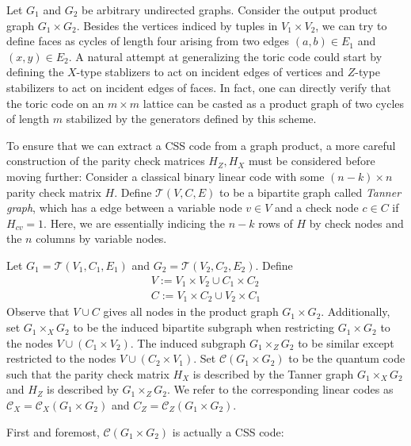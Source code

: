 \documentclass[12pt]{article}%
\theoremstyle{definition}
\begin{document}
Let $G_1$ and $G_2$ be arbitrary undirected graphs. Consider the output product graph $G_1 \times G_2$. Besides the vertices indiced by tuples in $V_1 \times V_2$, we can try to define faces as cycles of length four arising from two edges $(a,b) \in E_1$ and $(x,y) \in E_2$. A natural attempt at generalizing the toric code could start by defining the $X$-type stablizers to act on incident edges of vertices and $Z$-type stabilizers to act on incident edges of faces. In fact, one can directly verify that the toric code on an $m \times m$ lattice can be casted as a product graph of two cycles of length $m$ stabilized by the generators defined by this scheme. 

To ensure that we can extract a CSS code from a graph product, a more careful construction of the parity check matrices $H_Z, H_X$ must be considered before moving further: Consider a classical binary linear code with some $(n-k) \times n$ parity check matrix $H$. Define  $\mathcal{T}(V,C,E)$ to be a bipartite graph called \emph{Tanner graph}, which has a edge between a variable node $v \in V$ and a check node $c \in C$ if $H_{cv} = 1$. Here, we are essentially indicing the $n-k$ rows of $H$ by check nodes and the $n$ columns by variable nodes.


\vspace{7pt}
\begin{definition}
  Let $G_1 = \mathcal{T}(V_1, C_1, E_1)$ and $G_2 = \mathcal{T}(V_2, C_2, E_2)$. Define   \begin{gather*}
    V := V_1 \times V_2 \cup C_1 \times C_2 \\
    C := V_1 \times C_2 \cup V_2 \times C_1
  \end{gather*}
  Observe that $V \cup C$ gives all nodes in the product graph $G_1 \times G_2$. Additionally, set $G_1 \times_X G_2$ to be the induced bipartite subgraph when restricting $G_1 \times G_2$ to the nodes $V \cup (C_1 \times V_2)$. The induced subgraph $G_1 \times_Z G_2$ to be similar except restricted to the nodes $V \cup (C_2 \times V_1)$. Set $\mathcal{C}(G_1 \times G_2)$ to be the quantum code such that the parity check matrix $H_X$ is described by the Tanner graph $G_1 \times_X G_2$ and $H_Z$ is described by $G_1 \times_Z G_2$. We refer to the corresponding linear codes as $\mathcal{C}_X = \mathcal{C}_X(G_1 \times G_2)$ and $C_Z = \mathcal{C}_Z(G_1 \times G_2)$.
\end{definition}
\vspace{5pt}

\noindent First and foremost, $\mathcal{C}(G_1 \times G_2)$ is actually a CSS code:
\end{document}
